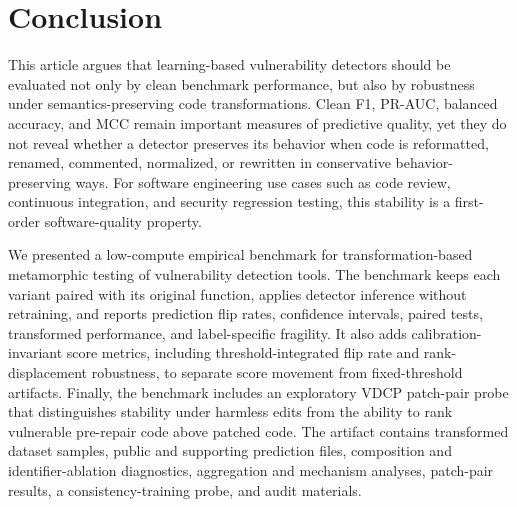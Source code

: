 \documentclass[a4paper,fleqn]{cas-dc}
\begin{document}
\section{Conclusion}

This article argues that learning-based vulnerability detectors should be
evaluated not only by clean benchmark performance, but also by robustness under
semantics-preserving code transformations. Clean F1, PR-AUC, balanced accuracy,
and MCC remain important measures of predictive quality, yet they do not reveal
whether a detector preserves its behavior when code is reformatted, renamed,
commented, normalized, or rewritten in conservative behavior-preserving ways.
For software engineering use cases such as code review, continuous integration, and
security regression testing, this stability is a first-order software-quality
property.

We presented a low-compute empirical benchmark for transformation-based
metamorphic testing of vulnerability detection tools. The benchmark keeps each
variant paired with its original function, applies detector inference without
retraining, and reports prediction flip rates, confidence intervals, paired
tests, transformed performance, and label-specific fragility. It also adds
calibration-invariant score metrics, including threshold-integrated flip rate
and rank-displacement robustness, to separate score movement from
fixed-threshold artifacts. Finally, the benchmark includes an exploratory VDCP
patch-pair probe that distinguishes stability under harmless edits from the
ability to rank vulnerable pre-repair code above patched code. The artifact
contains transformed dataset samples, public and supporting prediction files,
composition and identifier-ablation diagnostics, aggregation and mechanism
analyses, patch-pair results, a consistency-training probe, and audit materials.
\end{document}
